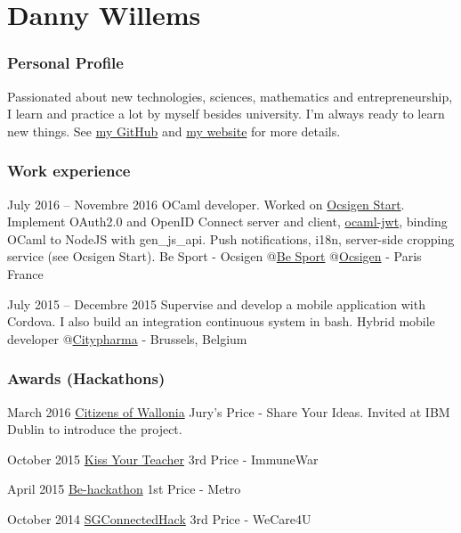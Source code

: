 \documentclass[fontsize=10pt]{tccv}
\begin{document}
\part{Danny Willems}

\section{Personal Profile}

Passionated about new technologies, sciences, mathematics and entrepreneurship,
I learn and practice a lot by myself besides university. I'm always ready to
learn new things. See \href{https://github.com/dannywillems}{my GitHub} and
\href{https://danny-willems.be}{my website} for more details.

\section{Work experience}

\begin{eventlist}

\item{July 2016 -- Novembre 2016}
	{OCaml developer. Worked on \href{https://github.com/ocsigen/ocsigen-start}{Ocsigen
  Start}. Implement OAuth2.0 and OpenID Connect server and client, \href{https://github.com/besport/ocaml-jwt}{ocaml-jwt},
  binding OCaml to NodeJS with gen\_js\_api. Push notifications, i18n, server-side
  cropping service (see Ocsigen Start).}
	{Be Sport - Ocsigen}
	@\href{https://besport.com}{Be Sport}
	@\href{https://ocsigen.org}{Ocsigen} - Paris France


\item{July 2015 -- Decembre 2015}
	{Supervise and develop a mobile application with Cordova. I also build an
	integration continuous system in bash.}
	 {Hybrid mobile developer} @\href{http://selfpharma.be}{Citypharma} -
	 Brussels, Belgium

\end{eventlist}

\section{Awards (Hackathons)}

\begin{yearlist}
	\item{March 2016}
		{\href{http://citizensofwallonia.be}{Citizens of Wallonia}}
		{Jury's Price - Share Your Ideas. Invited at IBM Dublin to introduce the
		project.}
	\item{October 2015}
		{\href{http://www.kissyourteacher.be/}{Kiss Your Teacher}}
		{3rd Price - ImmuneWar}
	\item{April 2015}
		{\href{http://www.be-hackathon.be/?lang=fr}{Be-hackathon}}
		{1st Price - Metro}
	\item{October 2014}
		{\href{http://sgconnectedhack.bemyapp.com/}{SGConnectedHack}}
		{3rd Price - WeCare4U}
\end{yearlist}
\end{document}
